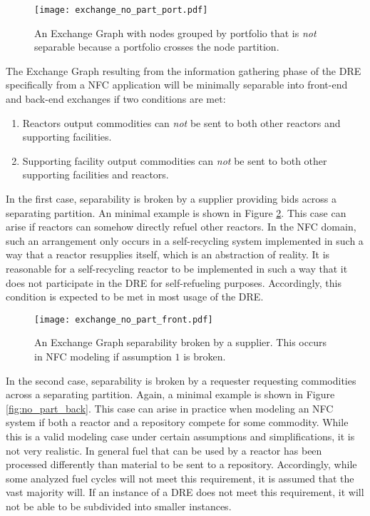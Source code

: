 \begin{figure}
  \begin{center}
    \texttt{[image: exchange\_no\_part\_port.pdf]}
    \caption[]{
      \label{fig:port_no_part}
      An Exchange Graph with nodes grouped by portfolio that is \textit{not}
      separable because a portfolio crosses the node partition.}
  \end{center}
\end{figure}

The Exchange Graph resulting from the information gathering phase of the DRE
specifically from a NFC application will be minimally separable into front-end
and back-end exchanges if two conditions are met:

\begin{enumerate}
  \item Reactors output commodities can \textit{not} be sent to both other
    reactors and supporting facilities.

  \item Supporting facility output commodities can \textit{not} be sent to both
    other supporting facilities and reactors.
\end{enumerate}

In the first case, separability is broken by a supplier providing bids across a
separating partition. An minimal example is shown in Figure
\ref{fig:no_part_front}. This case can arise if reactors can somehow directly
refuel other reactors. In the NFC domain, such an arrangement only occurs in a
self-recycling system implemented in such a way that a reactor resupplies
itself, which is an abstraction of reality. It is reasonable for a
self-recycling reactor to be implemented in such a way that it does not
participate in the DRE for self-refueling purposes. Accordingly, this condition
is expected to be met in most usage of the DRE.

\begin{figure}
  \begin{center}
    \texttt{[image: exchange\_no\_part\_front.pdf]}
    \caption[]{
      \label{fig:no_part_front}
      An Exchange Graph separability broken by a supplier. This occurs in NFC
      modeling if assumption $1$ is broken.}
  \end{center}
\end{figure}

In the second case, separability is broken by a requester requesting commodities
across a separating partition. Again, a minimal example is shown in Figure
\ref{fig:no_part_back}. This case can arise in practice when modeling an NFC
system if both a reactor and a repository compete for some commodity. While this
is a valid modeling case under certain assumptions and simplifications, it is
not very realistic. In general fuel that can be used by a reactor has been
processed differently than material to be sent to a repository. Accordingly,
while some analyzed fuel cycles will not meet this requirement, it is assumed
that the vast majority will. If an instance of a DRE does not meet this
requirement, it will not be able to be subdivided into smaller instances.

